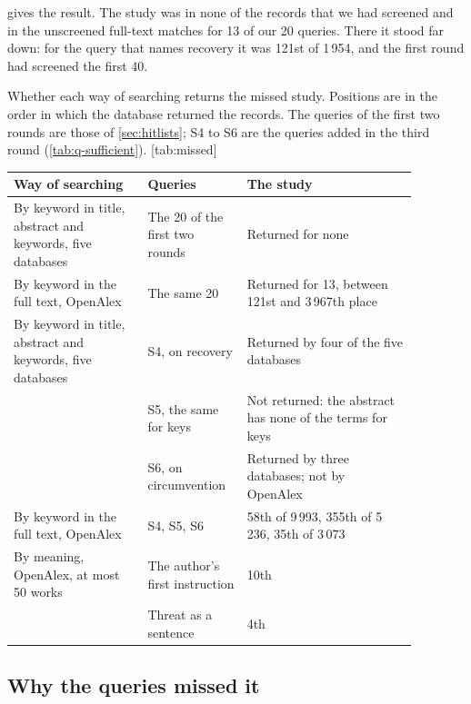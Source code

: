  gives the result.
The study was in none of the records that we had screened and in the
unscreened full-text matches for 13 of our 20 queries.
There it stood far down: for the query that names recovery it was
121st of 1\,954, and the first round had screened the first 40.
\begin{table}
  \begin{sidecaption}{%
    Whether each way of searching returns the missed study.
    Positions are in the order in which the database returned the
    records.
    The queries of the first two rounds are those of
    \cref{sec:hitlists}; S4 to S6 are the queries added in the third
    round (\cref{tab:q-sufficient}).
  }[tab:missed]
    \footnotesize
    \begin{tabular}{@{}L{0.30\linewidth}L{0.20\linewidth}L{0.38\linewidth}@{}}
      \toprule
      Way of searching & Queries & The study \\
      \midrule
      By keyword in title, abstract and keywords, five databases
        & The 20 of the first two rounds
        & Returned for none \\
      \addlinespace
      By keyword in the full text, OpenAlex
        & The same 20
        & Returned for 13, between 121st and 3\,967th place \\
      \midrule
      By keyword in title, abstract and keywords, five databases
        & S4, on recovery
        & Returned by four of the five databases \\
      \addlinespace
        & S5, the same for keys
        & Not returned: the abstract has none of the terms for keys \\
      \addlinespace
        & S6, on circumvention
        & Returned by three databases; not by OpenAlex \\
      \addlinespace
      By keyword in the full text, OpenAlex
        & S4, S5, S6
        & 58th of 9\,993, 355th of 5\,236, 35th of 3\,073 \\
      \midrule
      By meaning, OpenAlex, at most 50 works
        & The author's first instruction
        & 10th \\
      \addlinespace
        & Threat  as a sentence
        & 4th \\
      \bottomrule
    \end{tabular}
  \end{sidecaption}
\end{table}

\subsection{Why the queries missed it}

